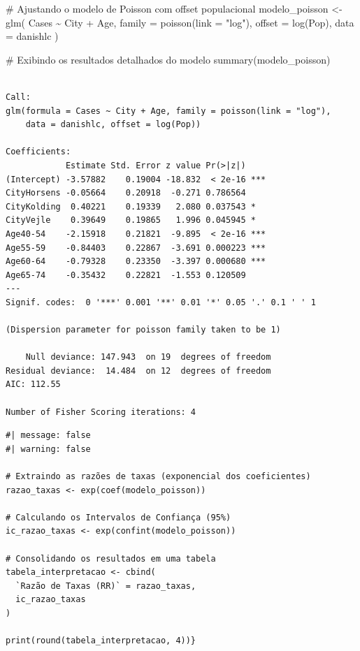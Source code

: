 \documentclass[
  letterpaper,
]{article}
\newenvironment{Shaded}{\begin{snugshade}}{\end{snugshade}}
\newcommand{\AttributeTok}[1]{\textcolor[rgb]{0.40,0.45,0.13}{#1}}
\newcommand{\CommentTok}[1]{\textcolor[rgb]{0.37,0.37,0.37}{#1}}
\newcommand{\FunctionTok}[1]{\textcolor[rgb]{0.28,0.35,0.67}{#1}}
\newcommand{\NormalTok}[1]{\textcolor[rgb]{0.00,0.23,0.31}{#1}}
\newcommand{\OtherTok}[1]{\textcolor[rgb]{0.00,0.23,0.31}{#1}}
\newcommand{\SpecialCharTok}[1]{\textcolor[rgb]{0.37,0.37,0.37}{#1}}
\newcommand{\StringTok}[1]{\textcolor[rgb]{0.13,0.47,0.30}{#1}}
\begin{document}
\begin{Shaded}
\begin{Highlighting}[]
\CommentTok{\# Ajustando o modelo de Poisson com offset populacional}
\NormalTok{modelo\_poisson }\OtherTok{\textless{}{-}} \FunctionTok{glm}\NormalTok{(}
\NormalTok{  Cases }\SpecialCharTok{\textasciitilde{}}\NormalTok{ City }\SpecialCharTok{+}\NormalTok{ Age, }
  \AttributeTok{family =} \FunctionTok{poisson}\NormalTok{(}\AttributeTok{link =} \StringTok{"log"}\NormalTok{), }
  \AttributeTok{offset =} \FunctionTok{log}\NormalTok{(Pop), }
  \AttributeTok{data =}\NormalTok{ danishlc}
\NormalTok{)}

\CommentTok{\# Exibindo os resultados detalhados do modelo}
\FunctionTok{summary}\NormalTok{(modelo\_poisson)}
\end{Highlighting}
\end{Shaded}

\begin{verbatim}

Call:
glm(formula = Cases ~ City + Age, family = poisson(link = "log"), 
    data = danishlc, offset = log(Pop))

Coefficients:
            Estimate Std. Error z value Pr(>|z|)    
(Intercept) -3.57882    0.19004 -18.832  < 2e-16 ***
CityHorsens -0.05664    0.20918  -0.271 0.786564    
CityKolding  0.40221    0.19339   2.080 0.037543 *  
CityVejle    0.39649    0.19865   1.996 0.045945 *  
Age40-54    -2.15918    0.21821  -9.895  < 2e-16 ***
Age55-59    -0.84403    0.22867  -3.691 0.000223 ***
Age60-64    -0.79328    0.23350  -3.397 0.000680 ***
Age65-74    -0.35432    0.22821  -1.553 0.120509    
---
Signif. codes:  0 '***' 0.001 '**' 0.01 '*' 0.05 '.' 0.1 ' ' 1

(Dispersion parameter for poisson family taken to be 1)

    Null deviance: 147.943  on 19  degrees of freedom
Residual deviance:  14.484  on 12  degrees of freedom
AIC: 112.55

Number of Fisher Scoring iterations: 4
\end{verbatim}

\begin{verbatim}
#| message: false
#| warning: false

# Extraindo as razões de taxas (exponencial dos coeficientes)
razao_taxas <- exp(coef(modelo_poisson))

# Calculando os Intervalos de Confiança (95%)
ic_razao_taxas <- exp(confint(modelo_poisson))

# Consolidando os resultados em uma tabela
tabela_interpretacao <- cbind(
  `Razão de Taxas (RR)` = razao_taxas, 
  ic_razao_taxas
)

print(round(tabela_interpretacao, 4))}
\end{verbatim}
\end{document}

